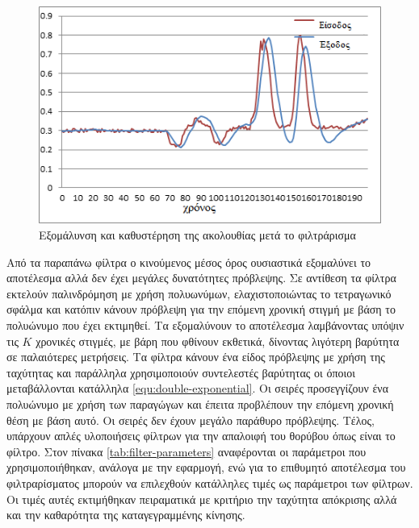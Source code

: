 \begin{figure}[H]
    \centering
    \includegraphics[width=.8\textwidth, keepaspectratio]{fig/filter-latency.png}
    \caption{Εξομάλυνση και καθυστέρηση της ακολουθίας μετά το φιλτράρισμα\protect\footnotemark}
    \label{fig:filter-latency}
\end{figure}

Από τα παραπάνω φίλτρα ο κινούμενος μέσος όρος ουσιαστικά εξομαλύνει το αποτέλεσμα αλλά δεν έχει μεγάλες δυνατότητες πρόβλεψης. Σε αντίθεση τα φίλτρα  εκτελούν παλινδρόμηση με χρήση πολυωνύμων, ελαχιστοποιώντας το τετραγωνικό σφάλμα και κατόπιν κάνουν πρόβλεψη για την επόμενη χρονική στιγμή με βάση το πολυώνυμο που έχει εκτιμηθεί. Τα  εξομαλύνουν το αποτέλεσμα λαμβάνοντας υπόψιν τις $Κ$ χρονικές στιγμές, με βάρη που φθίνουν εκθετικά, δίνοντας λιγότερη βαρύτητα σε παλαιότερες μετρήσεις. Τα  φίλτρα κάνουν ένα είδος πρόβλεψης με χρήση της ταχύτητας και παράλληλα χρησιμοποιούν συντελεστές βαρύτητας οι όποιοι μεταβάλλονται κατάλληλα \ref{equ:double-exponential}. Οι σειρές  προσεγγίζουν ένα πολυώνυμο με χρήση των παραγώγων και έπειτα προβλέπουν την επόμενη χρονική θέση με βάση αυτό. Οι σειρές  δεν έχουν μεγάλο παράθυρο πρόβλεψης. Τέλος, υπάρχουν απλές υλοποιήσεις φίλτρων για την απαλοιφή του θορύβου όπως είναι το  φίλτρο. Στον πίνακα \ref{tab:filter-parameters} αναφέρονται οι παράμετροι που χρησιμοποιήθηκαν, ανάλογα με την εφαρμογή, ενώ για το επιθυμητό αποτέλεσμα του φιλτραρίσματος μπορούν να επιλεχθούν κατάλληλες τιμές ως παράμετροι των φίλτρων. Οι τιμές αυτές εκτιμήθηκαν πειραματικά με κριτήριο την ταχύτητα απόκρισης αλλά και την καθαρότητα της καταγεγραμμένης κίνησης.

